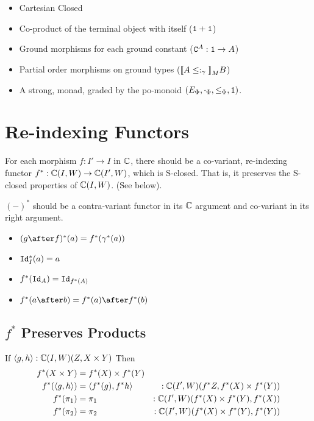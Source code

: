 \documentclass{report}
\newcommand\ciw[0]{\C(I, W)}
\newcommand\cipw[0]{\C(I', W)}
\renewcommand\star[0]{^*}
\newcommand\subtypeg[0]{\subtype_\g}
\begin{document}
\begin{itemize}
    \item Cartesian Closed
    \item Co-product of the terminal object with itself ($\texttt{1} + \texttt{1}$)
    \item Ground morphisms for each ground constant ($\texttt{C}^{A}: \texttt{1}\rightarrow A$)
    \item Partial order morphisms on ground types ($\deno{A\subtypeg} B$)
    \item A strong, monad, graded by the po-monoid $(E_\Phi, \cdot_\Phi, \leq_{\Phi}, \texttt{1})$.
\end{itemize}

\section{Re-indexing Functors}

For each morphism $f: I' \rightarrow I$ in $\mathbb{C}$, there should be a co-variant, re-indexing functor  $f\star: \ciw \rightarrow \cipw$, which is S-closed. That is, it preserves the S-closed properties of $\ciw$. (See below).

$(-)\star$ should be a contra-variant functor in its $\mathbb{C}$ argument and co-variant in its right argument.

\begin{itemize}
    \item $(g\after f)\star(a) = f\star(\g\star(a))$
    \item $\Id{I}\star(a) = a$
    \item $f\star(\Id{A}) = \Id{f\star(A)}$
    \item $f\star(a\after b) = f\star(a)\after f\star(b)$
\end{itemize}

\subsection{$f\star$ Preserves Products}
If $\pr{g}{h}:\ciw(Z, X\times Y)$
Then 
\begin{align}
    f\star(X\times Y) & = f\star(X)\times f\star(Y)\\
    f\star(\pr{g}{h}) & = \pr{f\star(g)}{f\star{h}}&:\cipw(f\star Z, f\star(X)\times f\star(Y))\\
    f\star(\p) & = \p&:\cipw(f\star(X)\times f\star(Y), f\star(X)) \\
    f\star(\pp) &= \pp&:\cipw(f\star(X)\times f\star(Y), f\star(Y))
\end{align}
\end{document}
